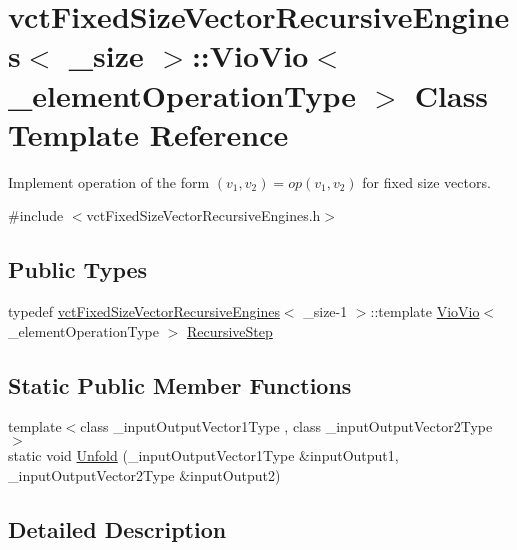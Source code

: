 \hypertarget{classvct_fixed_size_vector_recursive_engines_1_1_vio_vio}{}\section{vct\+Fixed\+Size\+Vector\+Recursive\+Engines$<$ \+\_\+size $>$\+:\+:Vio\+Vio$<$ \+\_\+element\+Operation\+Type $>$ Class Template Reference}
\label{classvct_fixed_size_vector_recursive_engines_1_1_vio_vio}


Implement operation of the form $(v_{1}, v_{2}) = op(v_{1}, v_{2})$ for fixed size vectors.  




{\ttfamily \#include $<$vct\+Fixed\+Size\+Vector\+Recursive\+Engines.\+h$>$}

\subsection*{Public Types}
\begin{DoxyCompactItemize}
\item 
typedef \hyperlink{classvct_fixed_size_vector_recursive_engines}{vct\+Fixed\+Size\+Vector\+Recursive\+Engines}$<$ \+\_\+size-\/1 $>$\+::template \hyperlink{classvct_fixed_size_vector_recursive_engines_1_1_vio_vio}{Vio\+Vio}$<$ \+\_\+element\+Operation\+Type $>$ \hyperlink{classvct_fixed_size_vector_recursive_engines_1_1_vio_vio_a90191766e286b1e089653e847b102a73}{Recursive\+Step}
\end{DoxyCompactItemize}
\subsection*{Static Public Member Functions}
\begin{DoxyCompactItemize}
\item 
{\footnotesize template$<$class \+\_\+input\+Output\+Vector1\+Type , class \+\_\+input\+Output\+Vector2\+Type $>$ }\\static void \hyperlink{classvct_fixed_size_vector_recursive_engines_1_1_vio_vio_aae5514f2d9b1fd021b82c69773d91b3a}{Unfold} (\+\_\+input\+Output\+Vector1\+Type \&input\+Output1, \+\_\+input\+Output\+Vector2\+Type \&input\+Output2)
\end{DoxyCompactItemize}


\subsection{Detailed Description}
